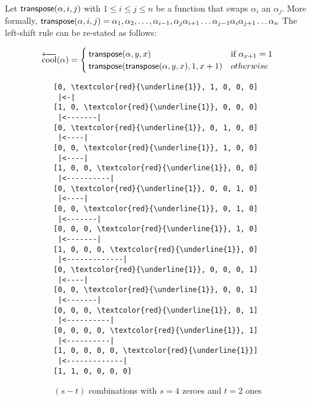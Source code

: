  Let $\mathsf{transpose(} \alpha, i, j \mathsf{)}$ with $1 \le i \le j \le n$ be a function that swaps $\alpha_i$ an $\alpha_j$.  More formally, $\mathsf{transpose(} \alpha, i, j \mathsf{)}=\alpha_1,\alpha_2,\dots,\alpha_{i-1},\alpha_{j}\alpha_{i+1}\dots \alpha_{j-1}\alpha_i \alpha_{j+1}\dots \alpha_n$
The left-shift rule can be re-stated as follows:

\begin{equation*}
    \overleftarrow{\text{cool}}(\alpha) = \begin{cases}
	\mathsf{transpose(} \alpha, y, x \mathsf{)} & \text{if $\alpha_{x+1}=1$}\\
	\mathsf{transpose(} \mathsf{transpose(} \alpha, y, x \mathsf{)}, 1, x+1 \mathsf{)} & otherwise\\
\end{cases}
\end{equation*}


\begin{figure}
    \begin{center}
	\begin{subfigure}[]{.25\textwidth}
            \begin{center}
\begin{Verbatim}[commandchars=\\\{\}]
[0, \textcolor{red}{\underline{1}}, 1, 0, 0, 0]
 |<-|
[1, 0, \textcolor{red}{\underline{1}}, 0, 0, 0]
 |<-------|
[0, \textcolor{red}{\underline{1}}, 0, 1, 0, 0]
 |<----|
[0, 0, \textcolor{red}{\underline{1}}, 1, 0, 0]
 |<----|
[1, 0, 0, \textcolor{red}{\underline{1}}, 0, 0]
 |<----------|
[0, \textcolor{red}{\underline{1}}, 0, 0, 1, 0]
 |<----|
[0, 0, \textcolor{red}{\underline{1}}, 0, 1, 0]
 |<-------|
[0, 0, 0, \textcolor{red}{\underline{1}}, 1, 0]
 |<-------|
[1, 0, 0, 0, \textcolor{red}{\underline{1}}, 0]
 |<-------------|
[0, \textcolor{red}{\underline{1}}, 0, 0, 0, 1]
 |<----|
[0, 0, \textcolor{red}{\underline{1}}, 0, 0, 1]
 |<-------|
[0, 0, 0, \textcolor{red}{\underline{1}}, 0, 1]
 |<----------|
[0, 0, 0, 0, \textcolor{red}{\underline{1}}, 1]
 |<----------|
[1, 0, 0, 0, 0, \textcolor{red}{\underline{1}}]
 |<-------------|
[1, 1, 0, 0, 0, 0]
\end{Verbatim}
            \end{center}
	    \caption{$(s-t)$ combinations with $s=4$ zeroes and $t=2$ ones}
            \label{subfig:coolcombo}
        \end{subfigure}
        \begin{subfigure}[]{.32\textwidth}
            \begin{center}
\begin{Verbatim}[commandchars=\\\{\}]

\end{Verbatim}
\end{center}
\end{subfigure}
\end{center}
\end{figure}

